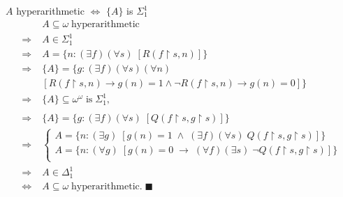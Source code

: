 \begin{frame}{$A$ hyperarithmetic $\Leftrightarrow$ $\{A\}$ is $\Sigma_1^1$}
  \begin{align*}
    \;&A\subseteq\omega\; \text{hyperarithmetic}\\
    \Rightarrow\; & A\in\Sigma_1^1\\
    \Rightarrow\; & A=\{n:(\exists f)(\forall s)\; [R(f\restriction s,n)]\}\\
    \Rightarrow\; & \{A\}= \{g:(\exists f)(\forall s)(\forall n)\\
    &[R(f\restriction s,n) \rightarrow g(n)=1 \wedge \neg R(f\restriction s,n)
      \rightarrow g(n)=0]\}\\
    \Rightarrow\; &\{A\}\subseteq\omega^\omega\; \text{is}\; \Sigma_1^1,\\
    &\\
    \Rightarrow\; & \{A\}= \{g:(\exists f)(\forall s)\; [Q(f\restriction
      s,g\restriction s)]\}\\
    \Rightarrow\; &
      \begin{cases}
        A=\{n:(\exists g)\; [g(n)=1\; \wedge\; (\exists f)(\forall s)\;
          Q(f\restriction s,g\restriction s)]\}\\
        A=\{n:(\forall g)\; [g(n)=0\; \rightarrow\; (\forall f)(\exists s)\;
          \neg Q(f\restriction s,g\restriction s)]\}\\
      \end{cases}\\
    \Rightarrow\; &A\in\Delta_1^1\\
    \Leftrightarrow\; &A\subseteq\omega\; \text{hyperarithmetic}.\;
    \blacksquare\\
  \end{align*}
\end{frame}

